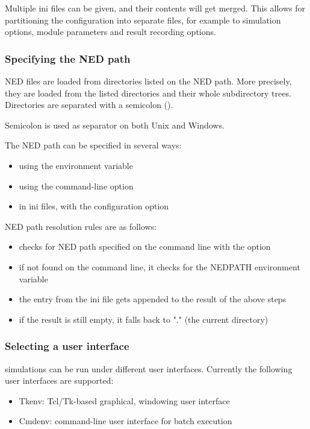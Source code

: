 Multiple ini files can be given, and their contents will get merged. This
allows for partitioning the configuration into separate files, for example
to simulation options, module parameters and result recording options.


\subsubsection{Specifying the NED path}

NED files are loaded from directories listed on the NED path. More precisely,
they are loaded from the listed directories and their whole subdirectory trees.
Directories are separated with a semicolon (\ttt{;}).

\begin{note}
Semicolon is used as separator on both Unix and Windows.
\end{note}

The NED path can be specified in several ways:
\begin{itemize}
  \item using the  environment variable
  \item using the  command-line option
  \item in ini files, with the  configuration option
\end{itemize}

NED path resolution rules are as follows:
\begin{itemize}
  \item {\opp} checks for NED path specified on the command line with the  option
  \item if not found on the command line, it checks for the NEDPATH environment variable
  \item the  entry from the ini file gets appended to the result of the above steps
  \item if the result is still empty, it falls back to "." (the current directory)
\end{itemize}


\subsubsection{Selecting a user interface}

{\opp} simulations can be run under different user interfaces.
Currently the following user interfaces are supported:

\begin{itemize}
  \item Tkenv: Tcl/Tk-based graphical, windowing user interface
  \item Cmdenv: command-line user interface for batch execution
\end{itemize}

